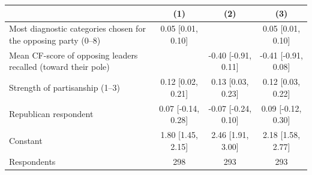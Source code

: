 \begin{tabular}{p{6.2cm}ccc}
\toprule
  & (1) & (2) & (3) \\
\midrule
Most diagnostic categories chosen for the opposing party (0--8) & 0.05 [0.01, 0.10] &  & 0.05 [0.01, 0.10] \\
Mean CF-score of opposing leaders recalled (toward their pole) &  & -0.40 [-0.91, 0.11] & -0.41 [-0.91, 0.08] \\
Strength of partisanship (1--3) & 0.12 [0.02, 0.21] & 0.13 [0.03, 0.23] & 0.12 [0.03, 0.22] \\
Republican respondent & 0.07 [-0.14, 0.28] & -0.07 [-0.24, 0.10] & 0.09 [-0.12, 0.30] \\
Constant & 1.80 [1.45, 2.15] & 2.46 [1.91, 3.00] & 2.18 [1.58, 2.77] \\
Respondents & 298 & 293 & 293 \\
\bottomrule
\end{tabular}
